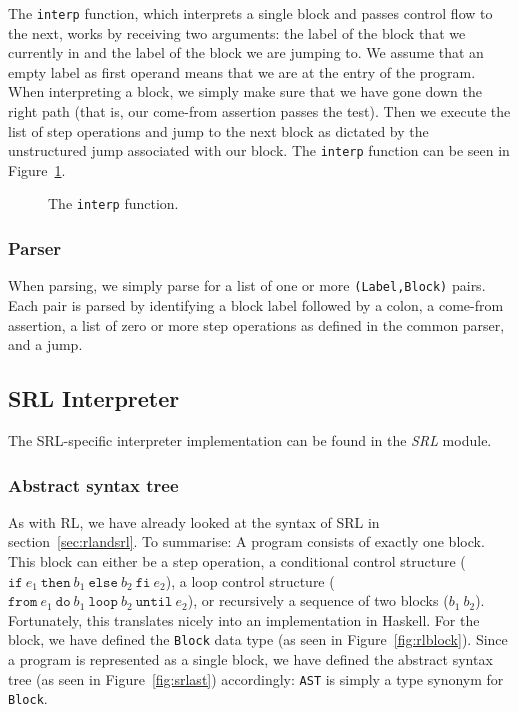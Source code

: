 The \texttt{interp} function, which interprets a single block and passes control flow to the next, works by receiving two arguments: the label of the block that we currently in and the label of the block we are jumping to. We assume that an empty label as first operand means that we are at the entry of the program. When interpreting a block, we simply make sure that we have gone down the right path (that is, our come-from assertion passes the test). Then we execute the list of step operations and jump to the next block as dictated by the unstructured jump associated with our block. The \texttt{interp} function can be seen in Figure~\ref{fig:interp}.

\begin{figure}[H]
  
  \caption{The \texttt{interp} function.}\label{fig:interp}
\end{figure}

\subsubsection{Parser}
When parsing, we simply parse for a list of one or more \texttt{(Label,Block)} pairs. Each pair is parsed by identifying a block label followed by a colon, a come-from assertion, a list of zero or more step operations as defined in the common parser, and a jump.

\subsection{SRL Interpreter}

The SRL-specific interpreter implementation can be found in the \textit{SRL} module.

\subsubsection{Abstract syntax tree}

As with RL, we have already looked at the syntax of SRL in section~\ref{sec:rlandsrl}. To summarise: A program consists of exactly one block. This block can either be a step operation, a conditional control structure ($\texttt{if} \ e_1 \ \texttt{then} \ b_1 \ \texttt{else} \ b_2 \ \texttt{fi} \ e_2$), a loop control structure ($\texttt{from} \ e_1 \ \texttt{do} \ b_1 \ \texttt{loop} \ b_2 \ \texttt{until} \ e_2$), or recursively a sequence of two blocks ($b_1 \ b_2$). Fortunately, this translates nicely into an implementation in Haskell. For the block, we have defined the \texttt{Block} data type (as seen in Figure~\ref{fig:rlblock}). Since a program is represented as a single block, we have defined the abstract syntax tree (as seen in Figure~\ref{fig:srlast}) accordingly: \texttt{AST} is simply a type synonym for \texttt{Block}.

